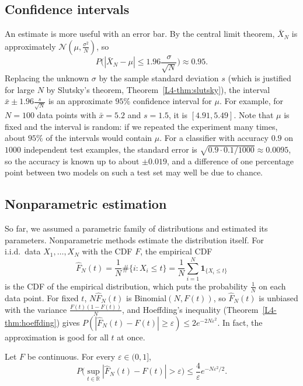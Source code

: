 \subsection{Confidence intervals}

An estimate is more useful with an error bar. By the central limit theorem, $\bar X_N$ is approximately $\mathcal{N}(\mu, \frac{\sigma^2}{N})$, so
\[P\Big(|\bar X_N - \mu| \leq 1.96\frac{\sigma}{\sqrt{N}}\Big) \approx 0.95.\]
Replacing the unknown $\sigma$ by the sample standard deviation $s$ (which is justified for large $N$ by Slutsky's theorem, Theorem~\ref{L4-thm:slutsky}), the interval $\bar x \pm 1.96\frac{s}{\sqrt{N}}$ is an approximate $95\%$ confidence interval for $\mu$. For example, for $N = 100$ data points with $\bar x = 5.2$ and $s = 1.5$, it is $[4.91, 5.49]$. Note that $\mu$ is fixed and the interval is random: if we repeated the experiment many times, about $95\%$ of the intervals would contain $\mu$. For a classifier with accuracy $0.9$ on $1000$ independent test examples, the standard error is $\sqrt{0.9 \cdot 0.1/1000} \approx 0.0095$, so the accuracy is known up to about $\pm 0.019$, and a difference of one percentage point between two models on such a test set may well be due to chance.

\subsection{Nonparametric estimation}\label{L4-sec:nonparametric}

So far, we assumed a parametric family of distributions and estimated its parameters. Nonparametric methods estimate the distribution itself. For i.i.d.\ data $X_1, \ldots, X_N$ with the CDF $F$, the empirical CDF
\[\hat F_N(t) = \frac{1}{N}\#\{i : X_i \leq t\} = \frac{1}{N}\sum_{i=1}^N \mathbf{1}_{\{X_i \leq t\}}\]
is the CDF of the empirical distribution, which puts the probability $\frac{1}{N}$ on each data point. For fixed $t$, $N\hat F_N(t)$ is Binomial$(N, F(t))$, so $\hat F_N(t)$ is unbiased with the variance $\frac{F(t)(1 - F(t))}{N}$, and Hoeffding's inequality (Theorem~\ref{L4-thm:hoeffding}) gives $P(|\hat F_N(t) - F(t)| \geq \varepsilon) \leq 2e^{-2N\varepsilon^2}$. In fact, the approximation is good for all $t$ at once.

\begin{theorem}\label{L4-thm:glivenko-cantelli}
    Let $F$ be continuous. For every $\varepsilon \in (0, 1]$,
    \[P\Big(\sup_{t \in \mathbb{R}} |\hat F_N(t) - F(t)| > \varepsilon\Big) \leq \frac{4}{\varepsilon}e^{-N\varepsilon^2/2}.\]
\end{theorem}

